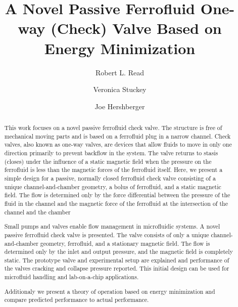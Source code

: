 \documentclass{asme2ej}
\title{A Novel Passive Ferrofluid One-way (Check) Valve Based on Energy Minimization}
\author{Robert L. Read
\affiliation{
  Founder, Public Invention\\
  Email: read.robert@pubinv.org
    }
}
\author{Veronica Stuckey
  \affiliation{
    Biomedical Engineer, University of Texas at Austin \\
    }
}
\author{Joe Hershberger
\affiliation{
  Investigato, Public Invention\\
    }
}
\begin{document}
\maketitle

\begin{abstract}

This work focuses on a novel passive ferrofluid check valve. The structure is free of mechanical moving parts and is based on a ferrofluid plug in a narrow channel.
Check valves, also known as one-way valves, are devices that allow fluids to move in only one direction primarily to prevent backflow in the system.
The valve returns to stasis (closes) under the influence of a static magnetic field when the pressure on the ferrofluid is less than the magnetic forces of the ferrofluid itself.
Here, we present a simple design for a passive, normally closed ferrofluid check valve consisting of a unique channel-and-chamber geometry, a bolus of ferrofluid, and a static magnetic field.
The flow is determined only by the force differential between the pressure of the fluid in the channel and the magnetic force of the ferrofluid at the intersection of the channel and the chamber

Small pumps and valves enable flow management in microfluidic systems.
A novel passive ferrofluid check valve is presented.
The valve consists of only a
unique channel-and-chamber geometry, ferrofluid, and a stationary
magnetic field.
The flow is determined only by the inlet and output pressure,
and the magnetic field is completely static.
The prototype valve and experimental setup are explained
and performance of the valves cracking and collapse pressure reported.
This initial design can be used for microfluid handling and lab-on-a-chip
applications.

Additionaly we present a theory of operation based on energy minimization
and compare predicted performance to actual performance.
\end{abstract}

\end{document}
